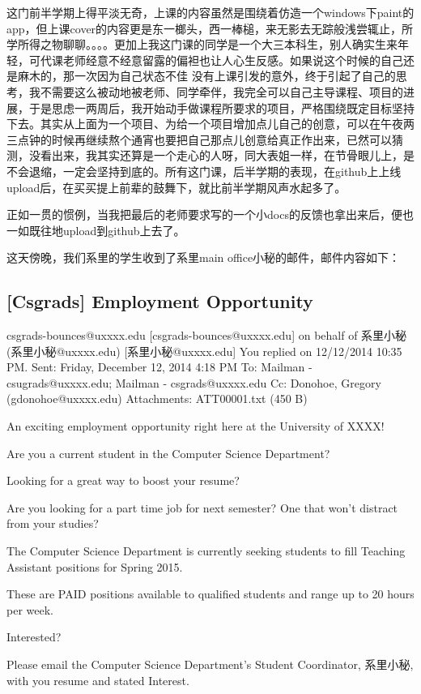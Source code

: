 \documentclass[12pt]{book}
\begin{document}
这门前半学期上得平淡无奇，上课的内容虽然是围绕着仿造一个windows下paint的app，但上课cover的内容更是东一榔头，西一棒槌，来无影去无踪般浅尝辄止，所学所得之物聊聊。。。。更加上我这门课的同学是一个大三本科生，别人确实生来年轻，可代课老师经意不经意留露的偏袒也让人心生反感。如果说这个时候的自己还是麻木的，那一次因为自己状态不佳 没有上课引发的意外，终于引起了自己的思考，我不需要这么被动地被老师、同学牵伴，我完全可以自己主导课程、项目的进展，于是思虑一两周后，我开始动手做课程所要求的项目，严格围绕既定目标坚持下去。其实从上面为一个项目、为给一个项目增加点儿自己的创意，可以在午夜两三点钟的时候再继续熬个通宵也要把自己那点儿创意给真正作出来，已然可以猜测，没看出来，我其实还算是一个走心的人呀，同大表姐一样，在节骨眼儿上，是不会退缩，一定会坚持到底的。所有这门课，后半学期的表现，在github上上线upload后，在买买提上前辈的鼓舞下，就比前半学期风声水起多了。

正如一贯的惯例，当我把最后的老师要求写的一个小docs的反馈也拿出来后，便也一如既往地upload到github上去了。

这天傍晚，我们系里的学生收到了系里main office小秘的邮件，邮件内容如下：

\subsection{[Csgrads] Employment Opportunity}
\label{sec-36-1-1}
csgrads-bounces@uxxxx.edu [csgrads-bounces@uxxxx.edu] on behalf of 系里小秘 (系里小秘@uxxxx.edu) [系里小秘@uxxxx.edu]
You replied on 12/12/2014 10:35 PM.
Sent:        Friday, December 12, 2014 4:18 PM
To:        
Mailman - csugrads@uxxxx.edu; Mailman - csgrads@uxxxx.edu
Cc:        
Donohoe, Gregory (gdonohoe@uxxxx.edu)
Attachments:        
ATT00001.txt‎ (450 B‎)

An exciting employment opportunity right here at the University of XXXX!

Are you a current student in the Computer Science Department? 

Looking for a great way to boost your resume?

Are you looking for a part time job for next semester? One that won't distract from your studies? 

The Computer Science Department is currently seeking students to fill Teaching Assistant positions for Spring 2015. 

These are PAID positions available to qualified students and range up to 20 hours per week. 

Interested? 

Please email the Computer Science Department's Student Coordinator, 系里小秘, with you resume and stated Interest. 
\end{document}
